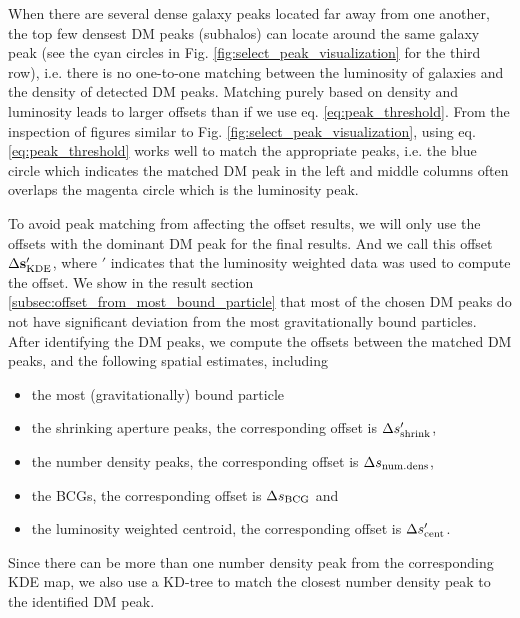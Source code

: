 When there are several dense galaxy peaks located far away from one another, 
the top few densest DM peaks (subhalos) can locate around the same galaxy
peak (see the cyan circles in Fig. \ref{fig:select_peak_visualization} for the
third row), i.e. there is no one-to-one matching between the luminosity of galaxies and the
density of detected DM peaks. 
Matching purely based on density and luminosity leads to larger offsets than if
we use eq. \ref{eq:peak_threshold}.
From the inspection of figures similar to 
Fig. \ref{fig:select_peak_visualization}, 
using eq. \ref{eq:peak_threshold} works well to match the 
appropriate peaks, i.e. the blue circle which indicates the matched DM peak 
in the left and middle columns 
often overlaps the magenta circle which is the luminosity peak.  

To avoid peak matching from affecting the offset results,
we will only use the offsets with the dominant DM peak for the final results.
And we call this offset $\Delta {\bf s}_{\rm KDE}'$, where $'$ indicates that the
luminosity weighted data was used to compute the offset. 
We show in the result section \ref{subsec:offset_from_most_bound_particle} 
that most of the chosen DM peaks
do not have significant deviation from the most gravitationally bound particles.
After identifying the DM peaks, we compute the 
offsets between the matched DM peaks, and the following spatial estimates, including 
\begin{itemize}
	\item the most (gravitationally) bound particle 
	\item the shrinking aperture peaks, the corresponding offset is $\Delta s_{\rm
		shrink}'$, 
	\item the number density peaks, the corresponding offset is $\Delta s_{\rm
		num.dens}$, 
	\item the BCGs, the corresponding offset is $\Delta s_{\rm BCG}$ and
\item the luminosity weighted centroid, the corresponding offset is $\Delta
	s_{\rm cent}'$.
\end{itemize}
Since there can be more than one number density peak from the corresponding KDE
map, we also use a KD-tree to match the closest number density peak to the 
identified DM peak.

